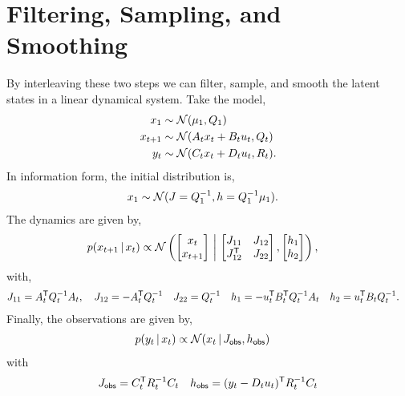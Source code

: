 \documentclass{article}
\begin{document}
\section*{Filtering, Sampling, and Smoothing}
By interleaving these two steps we can filter, sample, and smooth the latent states
in a linear dynamical system. Take the model,
\begin{align}
  x_1 &\sim \mathcal{N}(\mu_1, Q_1) \\
  x_{t+1} &\sim \mathcal{N}(A_t x_t + B_t u_t, Q_t) \\
  y_t &\sim \mathcal{N}(C_t x_t + D_t u_t, R_t).
\end{align}
In information form, the initial distribution is,
\begin{align}
  x_1 &\sim \mathcal{N}(J=Q_1^{-1}, h = Q_1^{-1} \mu_1).
\end{align}
The dynamics are given by,
\begin{align}
  p(x_{t+1} \,|\, x_t) & \propto 
  \mathcal{N} \left(
  \begin{bmatrix} x_t \\ x_{t+1}  \end{bmatrix}
  \, \bigg| \,
  \begin{bmatrix} 
    J_{11}        & J_{12} \\
    J_{12}^{\mathsf{T}} & J_{22} 
  \end{bmatrix},
  \begin{bmatrix} h_{1} \\ h_2 \end{bmatrix}
  \right), 
\end{align}
with,
\begin{align}
  J_{11} &= A_t^{\mathsf{T}} Q_t^{-1} A_t, \quad 
  J_{12} = -A_t^{\mathsf{T}} Q_t^{-1} \quad
  J_{22} = Q_t^{-1} \quad
  h_1 = -u_t^{\mathsf{T}} B_t^{\mathsf{T}} Q_t^{-1} A_t \quad
  h_2 = u_t^{\mathsf{T}} B_t Q_t^{-1}.
\end{align}
Finally, the observations are given by,
\begin{align}
  p(y_t \,|\, x_t) 
  &\propto \mathcal{N}(x_t \,|\, J_{\sf obs}, h_{\sf obs}) 
\end{align}
with
\begin{align}
  J_{\sf obs} = C_t^{\mathsf{T}} R_t^{-1} C_t \quad
  h_{\sf obs} = (y_t - D_t u_t)^{\mathsf{T}} R_t^{-1} C_t
\end{align}
\end{document}
